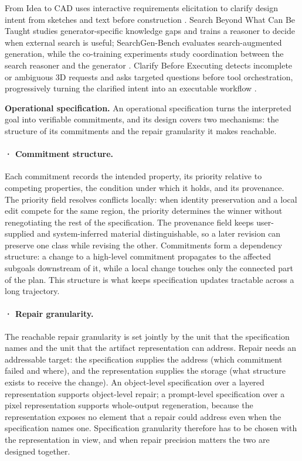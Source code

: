 From Idea to CAD uses interactive requirements elicitation to clarify design intent from sketches and text before construction \cite{ocker2025ideatocad}. Search Beyond What Can Be Taught studies generator-specific knowledge gaps and trains a reasoner to decide when external search is useful; SearchGen-Bench evaluates search-augmented generation, while the co-training experiments study coordination between the search reasoner and the generator \cite{wang2026searchgen}. Clarify Before Executing detects incomplete or ambiguous 3D requests and asks targeted questions before tool orchestration, progressively turning the clarified intent into an executable workflow \cite{avg260716352}.

\textbf{Operational specification.} An operational specification turns the interpreted goal into verifiable commitments, and its design covers two mechanisms: the structure of its commitments and the repair granularity it makes reachable.

\paragraph{· Commitment structure.} Each commitment records the intended property, its priority relative to competing properties, the condition under which it holds, and its provenance. The priority field resolves conflicts locally: when identity preservation and a local edit compete for the same region, the priority determines the winner without renegotiating the rest of the specification. The provenance field keeps user-supplied and system-inferred material distinguishable, so a later revision can preserve one class while revising the other. Commitments form a dependency structure: a change to a high-level commitment propagates to the affected subgoals downstream of it, while a local change touches only the connected part of the plan. This structure is what keeps specification updates tractable across a long trajectory.

\paragraph{· Repair granularity.} The reachable repair granularity is set jointly by the unit that the specification names and the unit that the artifact representation can address. Repair needs an addressable target: the specification supplies the address (which commitment failed and where), and the representation supplies the storage (what structure exists to receive the change). An object-level specification over a layered representation supports object-level repair; a prompt-level specification over a pixel representation supports whole-output regeneration, because the representation exposes no element that a repair could address even when the specification names one. Specification granularity therefore has to be chosen with the representation in view, and when repair precision matters the two are designed together.

